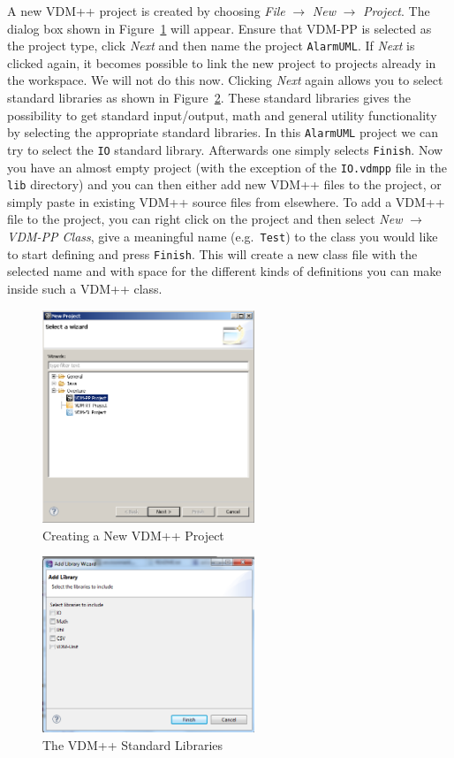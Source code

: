 A new VDM++ project is created by choosing \emph{File} $ \rightarrow$ \emph{New} $\rightarrow$ \emph{Project}. The dialog box shown in Figure~\ref{fig:newoverturePPproject} will appear. Ensure that VDM-PP is selected as the project type, click \emph{Next} and then name the project \texttt{AlarmUML}. If \emph{Next} is clicked again, it becomes possible to link the new project to projects already in the workspace.  We will not do this now.  Clicking \emph{Next} again allows you to select standard libraries as shown in Figure~\ref{fig:stdlibs}. These standard libraries gives the possibility to get standard input/output, math and general utility functionality by selecting the appropriate standard libraries. In this \texttt{AlarmUML} project we can try to select the \texttt{IO} standard library. Afterwards one simply selects \texttt{Finish}. Now you have an almost empty project (with the exception of the \texttt{IO.vdmpp} file in the \texttt{lib} directory) and you can then either add new VDM++ files to the project, or simply paste in existing VDM++ source files from elsewhere. To add a VDM++ file to the project, you can right click on the project and then select \emph{New} $\rightarrow$ \emph{VDM-PP Class}, give a meaningful name (e.g.\ \texttt{Test}) to the class you would like to start defining and press \texttt{Finish}. This will create a new class file with the selected name and with space for the different kinds of definitions you can make inside such a VDM++ class.
%
\begin{figure}[!htb]
\begin{center}
  \includegraphics[width=2.5in]{figures/newoverturePPproject}
  \caption[labelInTOC]{Creating a New VDM++ Project}
  \label{fig:newoverturePPproject}
\end{center}
\end{figure}
%
\begin{figure}[!htb]
\begin{center}
  \includegraphics[width=2.5in]{figures/stdlibs}
  \caption[labelInTOC]{The VDM++ Standard Libraries}
  \label{fig:stdlibs}
\end{center}
\end{figure}
%
